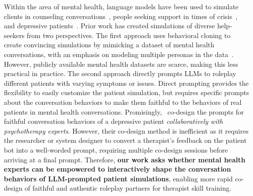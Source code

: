 %  
Within the area of mental health, language models have been used to simulate clients in counseling conversations~\citep{tanana2019development}, people seeking support in times of crisis~\citep{demasi-etal-2020-multi}, and depressive patients~\citep{chen2023llmempowered}. Prior work has created simulations of diverse help-seekers from two perspectives. The first approach uses behavioral cloning to create convincing simulations by mimicking a dataset of mental health conversations, with an emphasis on modeling multiple personas in the data~\citep{tanana2019development, chiu2024computational}. However, publicly available mental health datasets are scarce, making this less practical in practice. The second approach directly prompts LLMs to roleplay different patients with varying symptoms or issues. Direct prompting provides the flexibility to easily customize the patient simulation, but requires specific prompts about the conversation behaviors to make them faithful to the behaviors of real patients in mental health conversations. Promisingly,~\citet{chen2023llmempowered} co-design the prompts for faithful conversation behaviors of a depressive patient \textit{collaboratively with psychotherapy experts}. However, their co-design method is inefficient as it requires the researcher or system designer to convert a therapist's feedback on the patient bot into a well-worded prompt, requiring multiple co-design sessions before arriving at a final prompt. Therefore, \textbf{our work asks whether mental health experts can be empowered to interactively shape the conversation behaviors of LLM-prompted patient simulations}, enabling more rapid co-design of faithful and authentic roleplay partners for therapist skill training. 
  

